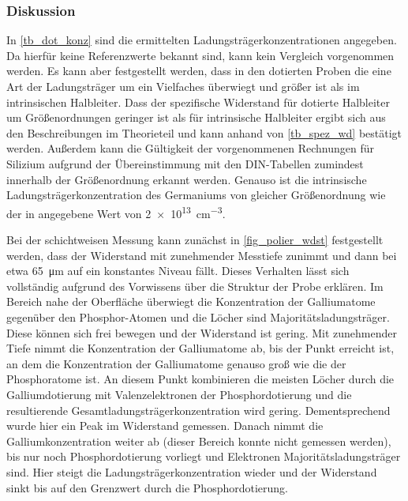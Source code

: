 \documentclass[
	a4paper,
	12pt,
	pagesize,
	ngerman
]{scrartcl}
\begin{document}
	\subsubsection{Diskussion}
	In \cref{tb_dot_konz} sind die ermittelten Ladungsträgerkonzentrationen angegeben.
	Da hierfür keine Referenzwerte bekannt sind, kann kein Vergleich vorgenommen werden.
	Es kann aber festgestellt werden, dass in den dotierten Proben die eine Art der Ladungsträger um ein Vielfaches überwiegt und größer ist als im intrinsischen Halbleiter.
	Dass der spezifische Widerstand für dotierte Halbleiter um Größenordnungen geringer ist als für intrinsische Halbleiter ergibt sich aus den Beschreibungen im Theorieteil und kann anhand von \cref{tb_spez_wd} bestätigt werden.
	Außerdem kann die Gültigkeit der vorgenommenen Rechnungen für Silizium aufgrund der Übereinstimmung mit den DIN-Tabellen zumindest innerhalb der Größenordnung erkannt werden.
	Genauso ist die intrinsische Ladungsträgerkonzentration des Germaniums von gleicher Größenordnung wie der in \cite{Kiel} angegebene Wert von \SI{2e13}{cm^{-3}}.

	Bei der schichtweisen Messung kann zunächst in \cref{fig_polier_wdst} festgestellt werden, dass der Widerstand mit zunehmender Messtiefe zunimmt und dann bei etwa \SI{65}{\micro \meter} auf ein konstantes Niveau fällt.
	Dieses Verhalten lässt sich vollständig aufgrund des Vorwissens über die Struktur der Probe erklären.
	Im Bereich nahe der Oberfläche überwiegt die Konzentration der Galliumatome gegenüber den Phosphor-Atomen und die Löcher sind Majoritätsladungsträger.
	Diese können sich frei bewegen und der Widerstand ist gering.
	Mit zunehmender Tiefe nimmt die Konzentration der Galliumatome ab, bis der Punkt erreicht ist, an dem die Konzentration der Galliumatome genauso groß wie die der Phosphoratome ist.
	An diesem Punkt kombinieren die meisten Löcher durch die Galliumdotierung mit Valenzelektronen der Phosphordotierung und die resultierende Gesamtladungsträgerkonzentration wird gering.
	Dementsprechend wurde hier ein Peak im Widerstand gemessen.
	Danach nimmt die Galliumkonzentration weiter ab (dieser Bereich konnte nicht gemessen werden), bis nur noch Phosphordotierung vorliegt und Elektronen Majoritätsladungsträger sind.
	Hier steigt die Ladungsträgerkonzentration wieder und der Widerstand sinkt bis auf den Grenzwert durch die Phosphordotierung.
\end{document}
